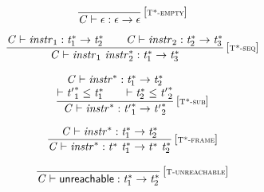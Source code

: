 \vspace{1ex}

$$
\begin{array}{@{}c@{}}\displaystyle
\frac{
}{
{\mathit{C}} \vdash \epsilon : \epsilon \rightarrow \epsilon
} \, {[\textsc{\scriptsize T*{-}empty}]}
\qquad
\end{array}
$$

$$
\begin{array}{@{}c@{}}\displaystyle
\frac{
{\mathit{C}} \vdash {\mathit{instr}}_{{1}} : {{\mathit{t}}_{{1}}^\ast} \rightarrow {{\mathit{t}}_{{2}}^\ast}
 \qquad
{\mathit{C}} \vdash {\mathit{instr}}_{{2}} : {{\mathit{t}}_{{2}}^\ast} \rightarrow {{\mathit{t}}_{{3}}^\ast}
}{
{\mathit{C}} \vdash {\mathit{instr}}_{{1}}~{{\mathit{instr}}_{{2}}^\ast} : {{\mathit{t}}_{{1}}^\ast} \rightarrow {{\mathit{t}}_{{3}}^\ast}
} \, {[\textsc{\scriptsize T*{-}seq}]}
\qquad
\end{array}
$$

$$
\begin{array}{@{}c@{}}\displaystyle
\frac{
\begin{array}{@{}c@{}}
{\mathit{C}} \vdash {{\mathit{instr}}^\ast} : {{\mathit{t}}_{{1}}^\ast} \rightarrow {{\mathit{t}}_{{2}}^\ast}
 \\
{ \vdash }\;{{\mathit{t}'}_{{1}}^\ast} \leq {{\mathit{t}}_{{1}}^\ast}
 \qquad
{ \vdash }\;{{\mathit{t}}_{{2}}^\ast} \leq {{\mathit{t}'}_{{2}}^\ast}
\end{array}
}{
{\mathit{C}} \vdash {{\mathit{instr}}^\ast} : {{\mathit{t}'}_{{1}}^\ast} \rightarrow {{\mathit{t}'}_{{2}}^\ast}
} \, {[\textsc{\scriptsize T*{-}sub}]}
\qquad
\end{array}
$$

$$
\begin{array}{@{}c@{}}\displaystyle
\frac{
{\mathit{C}} \vdash {{\mathit{instr}}^\ast} : {{\mathit{t}}_{{1}}^\ast} \rightarrow {{\mathit{t}}_{{2}}^\ast}
}{
{\mathit{C}} \vdash {{\mathit{instr}}^\ast} : {{\mathit{t}}^\ast}~{{\mathit{t}}_{{1}}^\ast} \rightarrow {{\mathit{t}}^\ast}~{{\mathit{t}}_{{2}}^\ast}
} \, {[\textsc{\scriptsize T*{-}frame}]}
\qquad
\end{array}
$$

\vspace{1ex}

$$
\begin{array}{@{}c@{}}\displaystyle
\frac{
}{
{\mathit{C}} \vdash \mathsf{unreachable} : {{\mathit{t}}_{{1}}^\ast} \rightarrow {{\mathit{t}}_{{2}}^\ast}
} \, {[\textsc{\scriptsize T{-}unreachable}]}
\qquad
\end{array}
$$

